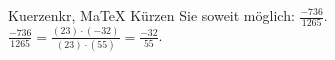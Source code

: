 \begin{MAufgabe}{Kuerzen}{kr, MaTeX}
K\"urzen Sie soweit m\"oglich: $\frac{-736}{1265}$.\\ 
\ifLsg\MLoesung
\quad $\frac{-736}{1265}=\frac{(23)\cdot(-32)}{(23)\cdot(55)}=\frac{-32}{55}$.\else\relax\fi
 \end{MAufgabe}